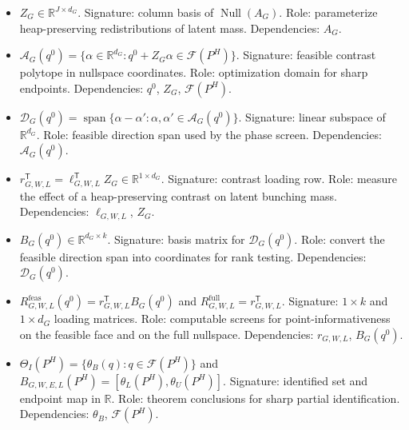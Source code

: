 \documentclass[11pt]{article}
\newcommand{\transpose}{\mathsf{T}}
\theoremstyle{definition}
\theoremstyle{plain}
\theoremstyle{remark}
\begin{document}
\begin{itemize}[leftmargin=*]
  \item \(Z_G\in\mathbb{R}^{J\times d_G}\).  Signature: column basis of \(\operatorname{Null}(A_G)\).  Role: parameterize heap-preserving redistributions of latent mass.  Dependencies: \(A_G\).
  \item \(\mathcal{A}_G(q^0)=\{\alpha\in\mathbb{R}^{d_G}:q^0+Z_G\alpha\in\mathcal{F}(P^H)\}\).  Signature: feasible contrast polytope in nullspace coordinates.  Role: optimization domain for sharp endpoints.  Dependencies: \(q^0\), \(Z_G\), \(\mathcal{F}(P^H)\).
  \item \(\mathcal{D}_G(q^0)=\operatorname{span}\{\alpha-\alpha':\alpha,\alpha'\in\mathcal{A}_G(q^0)\}\).  Signature: linear subspace of \(\mathbb{R}^{d_G}\).  Role: feasible direction span used by the phase screen.  Dependencies: \(\mathcal{A}_G(q^0)\).
  \item \(r_{G,W,L}^{\transpose}=\ell_{G,W,L}^{\transpose}Z_G\in\mathbb{R}^{1\times d_G}\).  Signature: contrast loading row.  Role: measure the effect of a heap-preserving contrast on latent bunching mass.  Dependencies: \(\ell_{G,W,L}\), \(Z_G\).
  \item \(B_G(q^0)\in\mathbb{R}^{d_G\times k}\).  Signature: basis matrix for \(\mathcal{D}_G(q^0)\).  Role: convert the feasible direction span into coordinates for rank testing.  Dependencies: \(\mathcal{D}_G(q^0)\).
  \item \(R^{\mathrm{feas}}_{G,W,L}(q^0)=r_{G,W,L}^{\transpose}B_G(q^0)\) and \(R^{\mathrm{full}}_{G,W,L}=r_{G,W,L}^{\transpose}\).  Signature: \(1\times k\) and \(1\times d_G\) loading matrices.  Role: computable screens for point-informativeness on the feasible face and on the full nullspace.  Dependencies: \(r_{G,W,L}\), \(B_G(q^0)\).
  \item \(\Theta_I(P^H)=\{\theta_B(q):q\in\mathcal{F}(P^H)\}\) and \(B_{G,W,E,L}(P^H)=[\theta_L(P^H),\theta_U(P^H)]\).  Signature: identified set and endpoint map in \(\mathbb{R}\).  Role: theorem conclusions for sharp partial identification.  Dependencies: \(\theta_B\), \(\mathcal{F}(P^H)\).
\end{itemize}
\end{document}
